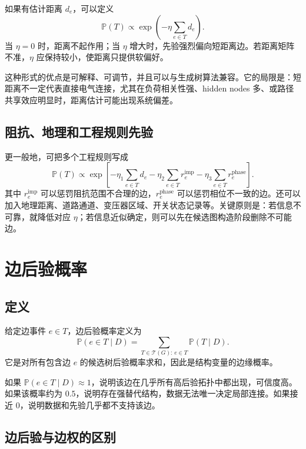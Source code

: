 \documentclass[UTF8,12pt,openany]{ctexrep}
\numberwithin{equation}{chapter}
\theoremstyle{definition}
\theoremstyle{plain}
\newcommand{\Prob}{\mathbb{P}}
\newcommand{\Tcal}{\mathcal{T}}
\begin{document}
如果有估计距离 $d_e$，可以定义
\begin{equation}
\Prob(T)
\propto
\exp\left(-\eta\sum_{e\in T}d_e\right).
\label{eq:distance-prior}
\end{equation}
当 $\eta=0$ 时，距离不起作用；当 $\eta$ 增大时，先验强烈偏向短距离边。若距离矩阵不准，$\eta$ 应保持较小，使距离只提供软偏好。

这种形式的优点是可解释、可调节，并且可以与生成树算法兼容。它的局限是：短距离不一定代表直接电气连接，尤其在负荷相关性强、hidden nodes 多、或路径共享效应明显时，距离估计可能出现系统偏差。

\section{阻抗、地理和工程规则先验}

更一般地，可把多个工程规则写成
\begin{equation}
\Prob(T)\propto
\exp\left[
-\eta_1\sum_{e\in T}d_e
-\eta_2\sum_{e\in T}r_e^{\mathrm{imp}}
-\eta_3\sum_{e\in T}r_e^{\mathrm{phase}}
\right].
\label{eq:engineering-prior}
\end{equation}
其中 $r_e^{\mathrm{imp}}$ 可以惩罚阻抗范围不合理的边，$r_e^{\mathrm{phase}}$ 可以惩罚相位不一致的边。还可以加入地理距离、道路通道、变压器区域、开关状态记录等。关键原则是：若信息不可靠，就降低对应 $\eta$；若信息近似确定，则可以先在候选图构造阶段删除不可能边。

\chapter{边后验概率}

\section{定义}

给定边事件 $e\in T$，边后验概率定义为
\begin{equation}
\Prob(e\in T\mid D)
=
\sum_{T\in\Tcal(G):\,e\in T}\Prob(T\mid D).
\label{eq:edge-posterior}
\end{equation}
它是对所有包含边 $e$ 的候选树后验概率求和，因此是结构变量的边缘概率。

如果 $\Prob(e\in T\mid D)\approx 1$，说明该边在几乎所有高后验拓扑中都出现，可信度高。如果该概率约为 $0.5$，说明存在强替代结构，数据无法唯一决定局部连接。如果接近 $0$，说明数据和先验几乎都不支持该边。

\section{边后验与边权的区别}
\end{document}
